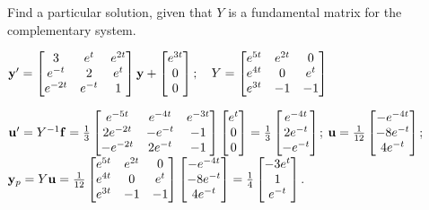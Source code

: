 \documentclass{ximera}
\begin{document}
 \begin{problem}\label{exer:10.7.18}
 Find a particular solution, given that $Y$ is a fundamental matrix for the complementary system.
 
$ {\bf y}'=
\begin{bmatrix}3&e^t&e^{2t}\\e^{-t}&2&e^t\\e^{-2t}&e^{-t}&1\end{bmatrix}{\bf
y}
+\begin{bmatrix}
e^{3t}\\0 \\ 0\end{bmatrix};  \quad Y=\begin{bmatrix}
e^{5t}&e^{2t}&0\\e^{4t}&0&e^t\\e^{3t}&-1&-1
\end{bmatrix}$

\begin{solution}
    ${\bf u}'=Y^{-1}{\bf f}=
\frac{1}{3}\begin{bmatrix}e^{-5t}&e^{-4t}&e^{-3t}\\
2e^{-2t}&-e^{-t}&-1\\-e^{-2t}&2e^{-t}&-1\end{bmatrix}
\begin{bmatrix}e^t\\0\\0\end{bmatrix}=
\frac{1}{3}\begin{bmatrix}
e^{-4t}\\2e^{-t}\\-e^{-t}\end{bmatrix}$;
${\bf u}=
\frac{1}{12}\begin{bmatrix}
-e^{-4t}\\-8e^{-t}\\4e^{-t}\end{bmatrix}$;
${\bf y}_p=Y{\bf u}=
\frac{1}{12}\begin{bmatrix}e^{5t}&e^{2t}&0\\
e^{4t}&0&e^t\\e^{3t}&-1&-1\end{bmatrix}
\begin{bmatrix}
-e^{-4t}\\-8e^{-t}\\4e^{-t}\end{bmatrix}=
\frac{1}{4}\begin{bmatrix}-3e^t\\
1\\e^{-t}\end{bmatrix}$.
\end{solution}
\end{problem}
\end{document}
